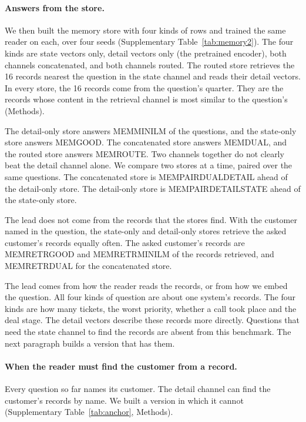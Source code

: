 \documentclass[11pt]{article}
\begin{document}
\paragraph{Answers from the store.} We then built the memory store with four kinds of rows and trained the same reader on each, over four seeds (Supplementary Table~\ref{tab:memory2}). The four kinds are state vectors only, detail vectors only (the pretrained encoder), both channels concatenated, and both channels routed. The routed store retrieves the 16 records nearest the question in the state channel and reads their detail vectors. In every store, the 16 records come from the question's quarter. They are the records whose content in the retrieval channel is most similar to the question's (Methods).

The detail-only store answers MEMMINILM of the questions, and the state-only store answers MEMGOOD. The concatenated store answers MEMDUAL, and the routed store answers MEMROUTE. Two channels together do not clearly beat the detail channel alone. We compare two stores at a time, paired over the same questions. The concatenated store is MEMPAIRDUALDETAIL ahead of the detail-only store. The detail-only store is MEMPAIRDETAILSTATE ahead of the state-only store.

The lead does not come from the records that the stores find. With the customer named in the question, the state-only and detail-only stores retrieve the asked customer's records equally often. The asked customer's records are MEMRETRGOOD and MEMRETRMINILM of the records retrieved, and MEMRETRDUAL for the concatenated store.

The lead comes from how the reader reads the records, or from how we embed the question. All four kinds of question are about one system's records. The four kinds are how many tickets, the worst priority, whether a call took place and the deal stage. The detail vectors describe these records more directly. Questions that need the state channel to find the records are absent from this benchmark. The next paragraph builds a version that has them.

\paragraph{When the reader must find the customer from a record.} Every question so far names its customer. The detail channel can find the customer's records by name. We built a version in which it cannot (Supplementary Table~\ref{tab:anchor}, Methods).
\end{document}
